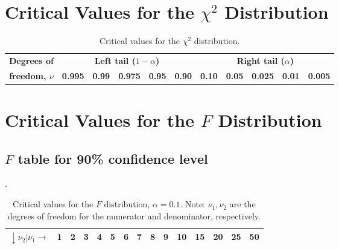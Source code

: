 \clearpage
\section{Critical Values for the $\chi^2$ Distribution}
\begin{table}[H]
\centering
\footnotesize
\begin{tabular}{|c|ccccc||ccccc|} \hline
\bf{Degrees of} &  \multicolumn{5}{|c||}{\bf{Left tail} ($1-\alpha$)}  & \multicolumn{5}{c|}{\bf{Right tail} ($\alpha$)} \\  \cline{2-11}
\bf{freedom, }$\nu$ &  \bf{0.995}  & \bf{0.99} & \bf{0.975} & \bf{0.95}  & \bf{0.90} &  \bf{0.10}  & \bf{0.05} & \bf{0.025} & \bf{0.01}  & \bf{0.005} \\ \hline

\end{tabular}
\normalsize
\caption{Critical values for the $\chi^2$ distribution.}
\label{tbl:Critical_chi2}
\end{table}

\clearpage
\section{Critical Values for the $F$ Distribution}
\label{sec:Ftables}

\subsection{$F$ table for 90\% confidence level}.

\begin{table}[h]
\centering
\footnotesize
\begin{tabular}{|c|cccccccccccccc|} \hline
$\downarrow \nu_2 | \nu_1 \rightarrow$ & \bf{1} & \bf{2} & \bf{3} & \bf{4} & \bf{5} & \bf{6} & \bf{7} & \bf{8} & \bf{9} & \bf{10} & \bf{15} & \bf{20} & \bf{25} & \bf{50} \\ \hline

\end{tabular}
\normalsize
\caption{Critical values for the $F$ distribution, $\alpha = 0.1$.  Note: $\nu_1, \nu_2$ are the degrees of freedom for
the numerator and denominator, respectively.}
\label{tbl:Critical_F90}
\end{table}

